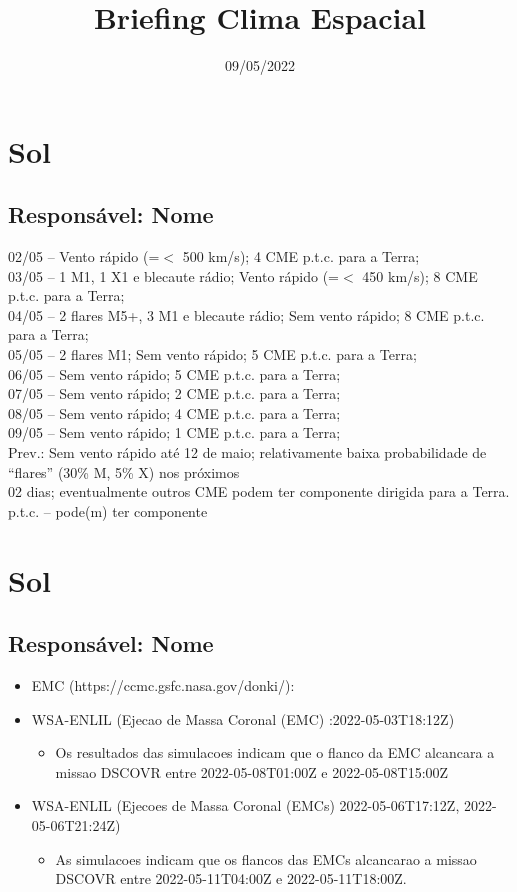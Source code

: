 \documentclass[a4paper, 10pt]{article}
\title{\Large{\textbf{Briefing Clima Espacial}}}
\date{09/05/2022}
\begin{document}
\maketitle 

  \thispagestyle{fancy} \section{Sol} 
 \subsection{Responsável: Nome}

02/05 – Vento rápido (=$<$ 500 km/s); 4 CME p.t.c. para a Terra; \\ 03/05 – 1 M1, 1 X1 e blecaute rádio; Vento rápido (=$<$ 450 km/s); 8 CME p.t.c. para a Terra; \\ 04/05 – 2 flares M5+, 3 M1 e blecaute rádio; Sem vento rápido; 8 CME p.t.c. para a Terra;  \\ 05/05 – 2 flares M1; Sem vento rápido; 5 CME p.t.c. para a Terra;  \\ 06/05 – Sem vento rápido; 5 CME p.t.c. para a Terra; \\ 07/05 – Sem vento rápido; 2 CME p.t.c. para a Terra; \\ 08/05 – Sem vento rápido; 4 CME p.t.c. para a Terra; \\ 09/05 – Sem vento rápido; 1 CME p.t.c. para a Terra; \\ Prev.: Sem vento rápido até 12 de maio; relativamente baixa probabilidade de “flares” (30\% M, 5\% X) nos próximos \\ 02 dias; eventualmente outros CME podem ter componente dirigida para a Terra. \\ p.t.c. – pode(m) ter componente\section{Sol} 
 \subsection{Responsável: Nome}

\begin{itemize} 
 \item EMC (https://ccmc.gsfc.nasa.gov/donki/):
\item WSA-ENLIL (Ejecao de Massa Coronal (EMC) :2022-05-03T18:12Z)
\begin{itemize} 
 \item Os resultados das simulacoes indicam que o flanco da EMC alcancara a missao DSCOVR entre 2022-05-08T01:00Z e 2022-05-08T15:00Z
\end{itemize} 
 \item WSA-ENLIL (Ejecoes de Massa Coronal (EMCs) 2022-05-06T17:12Z, 2022-05-06T21:24Z)
\begin{itemize} 
 \item As simulacoes indicam que os flancos das EMCs alcancarao a missao DSCOVR entre 2022-05-11T04:00Z e 2022-05-11T18:00Z. 
\end{itemize} 
 \end{itemize} 
 
\end{document}
